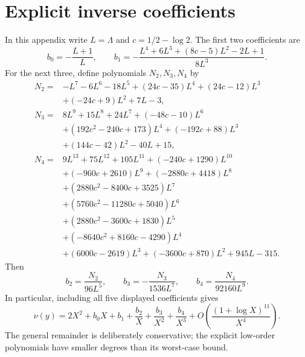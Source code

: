 \documentclass[11pt,letterpaper]{article}
\numberwithin{equation}{section}
\begin{document}
\section{Explicit inverse coefficients}\label{sma:sec:inversepolys}
In this appendix write $L=\Lambda$ and $c=1/2-\log2$. The first two coefficients are
\[
 b_0=-\frac{L+1}{L},\qquad
 b_1=-\frac{L^4+6L^3+(8c-5)L^2-2L+1}{8L^3}.
\]
For the next three, define polynomials $N_2,N_3,N_4$ by
\begin{align*}
 N_2={}&-L^7-6L^6-18L^5+(24c-35)L^4+(24c-12)L^3\\
       &+(-24c+9)L^2+7L-3,\\[3pt]
 N_3={}&8L^9+15L^8+24L^7+(-48c-10)L^6\\
       &+(192c^2-240c+173)L^4+(-192c+88)L^3\\
       &+(144c-42)L^2-40L+15,\\[3pt]
 N_4={}&9L^{13}+75L^{12}+105L^{11}+(-240c+1290)L^{10}\\
       &+(-960c+2610)L^9+(-2880c+4418)L^8\\
       &+(2880c^2-8400c+3525)L^7\\
       &+(5760c^2-11280c+5040)L^6\\
       &+(2880c^2-3600c+1830)L^5\\
       &+(-8640c^2+8160c-4290)L^4\\
       &+(6000c-2619)L^3+(-3600c+870)L^2+945L-315.
\end{align*}
Then
\begin{equation}\label{sma:eq:b234}
 b_2=\frac{N_2}{96L^5},\qquad
 b_3=-\frac{N_3}{1536L^7},\qquad
 b_4=\frac{N_4}{92160L^9}.
\end{equation}
In particular, including all five displayed coefficients gives
\[
 \nu(y)=2X^2+b_0X+b_1+\frac{b_2}{X}+\frac{b_3}{X^2}+\frac{b_4}{X^3}
 +O\!\left(\frac{(1+\log X)^{11}}{X^4}\right).
\]
The general remainder is deliberately conservative; the explicit low-order polynomials have smaller degrees than its worst-case bound.
\end{document}
